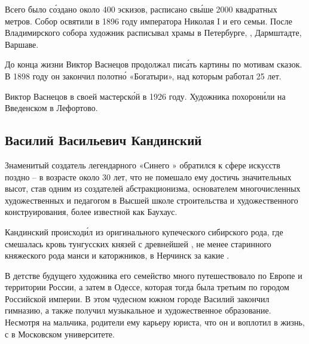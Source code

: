 Всего было с\'{о}здано около 400 эскизов, расписано св\'{ы}ше 2000 квадратных метров. Собор освятили в 1896 году  императора Николая I и его семьи. После Владимирского собора художник расписывал храмы в Петербурге, , Дармштадте, Варшаве.

До конца жизни Виктор Васнецов продолжал пис\'{а}ть картины по мотивам сказок. В 1898 году он закончил полотн\'{о} «Богатыри», над которым работал 25 лет.

Виктор Васнецов  в своей мастерск\'{о}й в 1926 году. Художника похорон\'{и}ли на Введенском  в Лефортово.


\subsection{Василий Васильевич Кандинский}
Знаменитый создатель легендарного «Синего » обратился к сфере искусств  поздно -- в возрасте около 30 лет, что не помешало ему достичь значительных высот, став одним из создателей абстракционизма, основателем многочисленных художественных  и педагогом в Высшей школе строительства и художественного конструирования, более известной как Баухаус.

Кандинский происход\'{и}л из оригинального купеческого сибирского рода, где  смешалась кровь тунгусских князей с древнейшей , не менее старинного княжеского рода манси и каторжников,  в Нерчинск за  какие .

В детстве будущего художника его семейство много путешествовало по Европе и территории России, а затем  в Одессе, которая тогда была третьим по  городом Российской империи. В этом чудесном южном городе Василий закончил гимназию, а также получил музыкальное и художественное образование. Несмотря на   мальчика, родители  ему карьеру юриста, что он и воплотил в жизнь,  с  в Московском университете.

